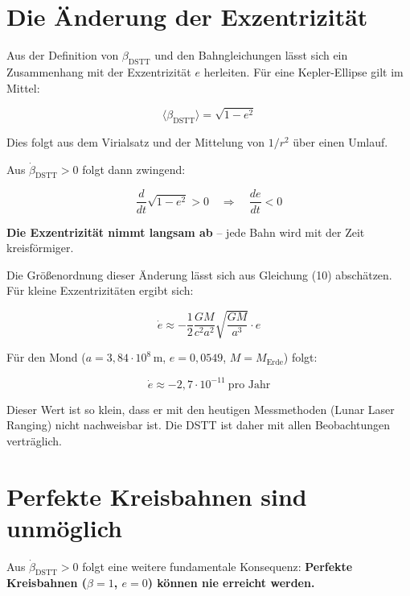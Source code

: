 \documentclass[12pt,a4paper]{article}
\begin{document}
\section{Die Änderung der Exzentrizität}

Aus der Definition von \(\beta_{\text{DSTT}}\) und den Bahngleichungen lässt sich ein Zusammenhang mit der Exzentrizität \(e\) herleiten. Für eine Kepler-Ellipse gilt im Mittel:

\begin{equation}
\langle \beta_{\text{DSTT}} \rangle = \sqrt{1 - e^2}
\end{equation}

Dies folgt aus dem Virialsatz und der Mittelung von \(1/r^2\) über einen Umlauf.

Aus \(\dot{\beta}_{\text{DSTT}} > 0\) folgt dann zwingend:

\begin{equation}
\frac{d}{dt} \sqrt{1 - e^2} > 0 \quad \Rightarrow \quad \frac{de}{dt} < 0
\end{equation}

\textbf{Die Exzentrizität nimmt langsam ab} – jede Bahn wird mit der Zeit kreisförmiger.

Die Größenordnung dieser Änderung lässt sich aus Gleichung (10) abschätzen. Für kleine Exzentrizitäten ergibt sich:

\begin{equation}
\dot{e} \approx -\frac{1}{2} \frac{GM}{c^2 a^2} \sqrt{\frac{GM}{a^3}} \cdot e
\end{equation}

Für den Mond (\(a = 3,84 \cdot 10^8 \, \text{m}\), \(e = 0,0549\), \(M = M_{\text{Erde}}\)) folgt:

\begin{equation}
\dot{e} \approx -2,7 \cdot 10^{-11} \ \text{pro Jahr}
\end{equation}

Dieser Wert ist so klein, dass er mit den heutigen Messmethoden (Lunar Laser Ranging) nicht nachweisbar ist. Die DSTT ist daher mit allen Beobachtungen verträglich.

\section{Perfekte Kreisbahnen sind unmöglich}

Aus \(\dot{\beta}_{\text{DSTT}} > 0\) folgt eine weitere fundamentale Konsequenz:  
\textbf{Perfekte Kreisbahnen (\(\beta = 1\), \(e = 0\)) können nie erreicht werden.}
\end{document}
